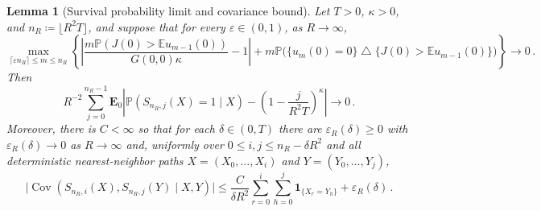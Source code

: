 \documentclass[11pt]{amsart}
\theoremstyle{plain}
\newtheorem{lemma}[theorem]{Lemma}
\theoremstyle{definition}
\newcommand{\E}{\mathbb{E}}
\renewcommand{\P}{\mathbb{P}}
\DeclareMathOperator{\Cov}{Cov}
\newcommand{\one}{\mathbf{1}}
\begin{document}
\begin{lemma}[Survival probability limit and covariance bound]
\label{lem:dgt4-path-survival}
	Let $T>0$, $\kappa>0$, and $n_R\coloneqq\lfloor R^2T\rfloor$, and suppose that for every
	$\varepsilon\in(0,1)$, as $R\to\infty$,
	\begin{equation}\label{eq:dgt4-uniform-contact-thresholds}
		\max_{\lceil\varepsilon n_R\rceil\leq m\leq n_R}\left\{\left|\frac{m\P(J(0)>\E u_{m-1}(0))}{G(0,0)\kappa}-1\right|+m\P\bigl(\{u_m(0)=0\}\mathbin{\triangle}\{J(0)>\E u_{m-1}(0)\}\bigr)\right\}\longrightarrow0\, .
	\end{equation}
	Then
	\begin{equation}\label{eq:dgt4-averaged-positive-path-limit}
		R^{-2}\sum_{j=0}^{n_R-1}\mathbf E_0\left|\P(S_{n_R,j}(X)=1\mid X)-\left(1-\frac{j}{R^2T}\right)^\kappa\right|\longrightarrow0\, .
	\end{equation}
	Moreover, there is $C<\infty$ so that for each $\delta\in(0,T)$ there are $\varepsilon_R(\delta)\geq0$ with
	$\varepsilon_R(\delta)\to0$ as $R\to\infty$ and, uniformly over $0\leq i,j\leq n_R-\delta R^2$ and all
	deterministic nearest-neighbor paths $X=(X_0,\ldots,X_i)$ and $Y=(Y_0,\ldots,Y_j)$,
	\begin{equation}\label{eq:dgt4-positive-path-covariance}
		\bigl|\Cov(S_{n_R,i}(X),S_{n_R,j}(Y)\mid X,Y)\bigr|\leq\frac{C}{\delta R^2}\sum_{r=0}^i\sum_{h=0}^j\one_{\{X_r=Y_h\}}+\varepsilon_R(\delta)\, .
	\end{equation}
\end{lemma}
\end{document}
